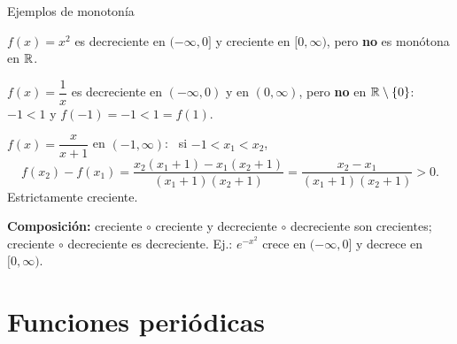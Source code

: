 \documentclass[10pt,aspectratio=169]{beamer}
\begin{document}
\begin{frame}{Ejemplos de monotonía}
  \begin{ejemplo}[2]
    $f(x)=x^2$ es decreciente en $(-\infty,0]$ y creciente en $[0,\infty)$, pero \textbf{no} es monótona en $\mathbb{R}$.
  \end{ejemplo}
  \begin{ejemplo}[3]
    $f(x)=\dfrac1x$ es decreciente en $(-\infty,0)$ y en $(0,\infty)$, pero \textbf{no} en $\mathbb{R}\setminus\{0\}$: \ $-1<1$ y $f(-1)=-1<1=f(1)$.
  \end{ejemplo}
  \begin{ejemplo}
    $f(x)=\dfrac{x}{x+1}$ en $(-1,\infty)$: \ si $-1<x_1<x_2$,
    \[ f(x_2)-f(x_1)=\frac{x_2(x_1+1)-x_1(x_2+1)}{(x_1+1)(x_2+1)}=\frac{x_2-x_1}{(x_1+1)(x_2+1)}>0. \]
    Estrictamente creciente.
  \end{ejemplo}
  \small \textbf{Composición:} creciente $\circ$ creciente y decreciente $\circ$ decreciente son crecientes; creciente $\circ$ decreciente
  es decreciente. Ej.: $e^{-x^2}$ crece en $(-\infty,0]$ y decrece en $[0,\infty)$.
\end{frame}

\section{Funciones periódicas}
\end{document}
